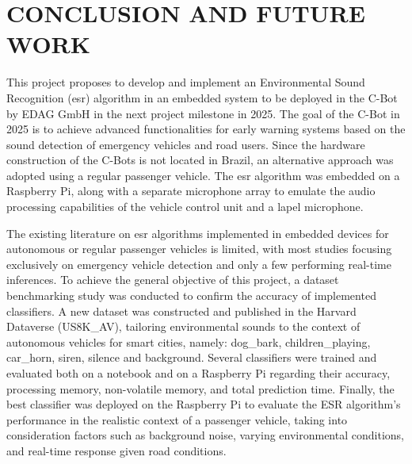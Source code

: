 \chapter{CONCLUSION AND FUTURE WORK}
\label{chp:conclusion}

This project proposes to develop and implement an Environmental Sound Recognition (\gls{esr}) algorithm in an embedded system to be deployed in the C-Bot by EDAG GmbH in the next project milestone in 2025. The goal of the C-Bot in 2025 is to achieve advanced functionalities for early warning systems based on the sound detection of emergency vehicles and road users. Since the hardware construction of the C-Bots is not located in Brazil, an alternative approach was adopted using a regular passenger vehicle. The \gls{esr} algorithm was embedded on a Raspberry Pi, along with a separate microphone array to emulate the audio processing capabilities of the vehicle control unit and a lapel microphone.

The existing literature on \gls{esr} algorithms implemented in embedded devices for autonomous or regular passenger vehicles is limited, with most studies focusing exclusively on emergency vehicle detection and only a few performing real-time inferences. To achieve the general objective of this project, a dataset benchmarking study was conducted to confirm the accuracy of implemented classifiers. A new dataset was constructed and published in the Harvard Dataverse (US8K\_AV), tailoring environmental sounds to the context of autonomous vehicles for smart cities, namely: dog\_bark, children\_playing, car\_horn, siren, silence and background. Several classifiers were trained and evaluated both on a notebook and on a Raspberry Pi regarding their accuracy, processing memory, non-volatile memory, and total prediction time. Finally, the best classifier was deployed on the Raspberry Pi to evaluate the ESR algorithm's performance in the realistic context of a passenger vehicle, taking into consideration factors such as background noise, varying environmental conditions, and real-time response given road conditions.



